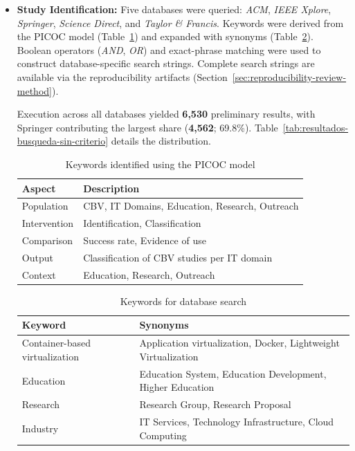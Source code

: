 \begin{itemize}
    \item \textbf{Study Identification:} Five databases were queried: \textit{ACM}, \textit{IEEE Xplore}, \textit{Springer}, \textit{Science Direct}, and \textit{Taylor \& Francis}. Keywords were derived from the PICOC model (Table~\ref{tab:palabras-clave}) and expanded with synonyms (Table~\ref{tab:keywords}). Boolean operators (\textit{AND}, \textit{OR}) and exact-phrase matching were used to construct database-specific search strings. Complete search strings are available via the reproducibility artifacts (Section~\ref{sec:reproducibility-review-method}).
    
    Execution across all databases yielded \textbf{6,530} preliminary results, with Springer contributing the largest share (\textbf{4,562}; 69.8\%). Table~\ref{tab:resultados-busqueda-sin-criterio} details the distribution.

    \begin{table}[H]
        \caption{Keywords identified using the PICOC model}
        \label{tab:palabras-clave}
        \scriptsize
        \centering
        \setlength{\tabcolsep}{4pt}
        \renewcommand{\arraystretch}{1.05}
        \begin{tabularx}{\columnwidth}{@{}l>{\RaggedRight\arraybackslash}X@{}}
            \toprule
            \textbf{Aspect} & \textbf{Description} \\
            \midrule
            Population & CBV, IT Domains, Education, Research, Outreach \\
            Intervention & Identification, Classification \\
            Comparison & Success rate, Evidence of use \\
            Output & Classification of CBV studies per IT domain \\
            Context & Education, Research, Outreach \\
            \bottomrule
        \end{tabularx}
    \end{table}

\begin{table}[H]
    \caption{Keywords for database search}
    \label{tab:keywords}
    \scriptsize
    \centering
    \setlength{\tabcolsep}{4pt}
    \renewcommand{\arraystretch}{1.05}
    \begin{tabularx}{\columnwidth}{@{}l>{\RaggedRight\arraybackslash}X@{}}
        \toprule
        \textbf{Keyword} & \textbf{Synonyms} \\
        \midrule
        Container-based virtualization & Application virtualization, Docker, Lightweight Virtualization \\
        Education & Education System, Education Development, Higher Education \\
        Research & Research Group, Research Proposal \\
        Industry & IT Services, Technology Infrastructure, Cloud Computing \\
        \bottomrule
    \end{tabularx}
\end{table}


\end{itemize}

